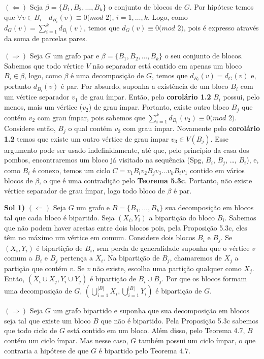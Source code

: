 
$(\Leftarrow)$ Seja $\beta = \{B_1, B_2, \ldots , B_k\}$ o conjunto de blocos
de $G$. Por hipótese temos que $\forall v \in B_i\quad d_{B_i}(v) \equiv 0 (mod$
$2)$, $i = 1, \ldots, k$. Logo, como $d_G(v) = \sum_{i = 1}^{k} d_{B_i}(v)$, 
temos que $d_G(v) \equiv 0 (mod$ $2)$, pois é expresso através da soma de 
parcelas pares.

$(\Rightarrow)$ Seja $G$ um grafo par e $\beta = \{B_1, B_2, \ldots , B_k\}$ 
o seu conjunto de blocos. Sabemos que todo vértice $V$ não separador está 
contido em apenas um bloco $B_i \in \beta$, logo, como $\beta$ é uma 
decomposição de $G$, temos que $d_{B_i}(v) = d_G(v)$ e, portanto $d_{B_i}(v)$ 
é par. Por absurdo, suponha a existência de um bloco $B_i$ com um vértice 
separador $v_1$ de grau ímpar. Então, pelo {\bf corolário 1.2} $B_i$ possui,
pelo menos, mais um vértice ($v_2$) de grau ímpar. Portanto, existe outro
bloco $B_j$ que contém $v_2$ com grau ímpar, pois sabemos que
$\sum_{i = 1}^{k} d_{B_i}(v_2) \equiv 0 (mod$ $2)$. Considere então, $B_j$
o qual contém $v_2$ com grau ímpar. Novamente pelo {\bf corolário 1.2} temos
que existe um outro vértice de grau ímpar $v_3 \in V(B_j)$. Esse argumento 
pode ser usado indefinidamente, até que, pelo princípio da casa dos pombos, 
encontraremos um bloco já visitado na sequência (Spg, $B_i$, $B_j$, \ldots, $B_i$),
e, como $B_i$ é conexo, temos um ciclo $C = v_1B_iv_2B_jv_3\ldots v_kB_iv_1$
contido em vários blocos de $\beta$, o que é uma contradição pelo 
{\bf Teorema 5.3c}. Portanto, não existe vértice separador de grau ímpar, logo
todo bloco de $\beta$ é par.

\fimprova

{\bf Sol 1)} $(\Leftarrow)$ Seja $G$ um grafo e $B = \{B_1, \dotsc, B_k\}$ sua
decomposição em blocos tal que cada bloco é bipartido. Seja $(X_i, Y_i)$ a
bipartição do bloco $B_i$. Sabemos que não podem haver arestas entre dois
blocos pois, pela Proposição 5.3c, eles têm no máximo um vértice em comum.
Considere dois blocos $B_i$ e $B_j$. Se $(X_i,Y_i)$ é bipartição de $B_i$, sem
perda de generalidade suponha que o vértice $v$ comum a $B_i$ e $B_j$ pertença
a $X_i$. Na bipartição de $B_j$, chamaremos de $X_j$ a partição que contém $v$.
Se $v$ não existe, escolha uma partição qualquer como $X_j$. Então, $(X_i \cup
X_j, Y_i \cup Y_j)$ é bipartição de $B_i \cup B_j$. Por que os blocos formam
uma decomposição de $G$, $(\bigcup_{i=1}^{|B|} X_i, \bigcup_{i=1}^{|B|} Y_i)$ é
bipartição de $G$.

$(\Rightarrow)$ Seja $G$ um grafo bipartido e suponha que sua decomposição em
blocos seja tal que existe um bloco $B$ que não é bipartido. Pela Proposição
5.3c sabemos que todo ciclo de $G$ está contido em um bloco. Além disso, pelo
Teorema 4.7, $B$ contém um ciclo ímpar. Mas nesse caso, $G$ também possui um
ciclo ímpar, o que contraria a hipótese de que $G$ é bipartido pelo Teorema
4.7.

